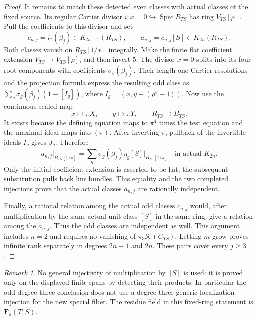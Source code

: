 \documentclass[11pt,a4paper]{article}
\theoremstyle{remark}
\newtheorem{remark}[theorem]{Remark}
\begin{document}
\begin{proof}
It remains to match these detected even classes with actual
classes of the fixed source.  Its regular Cartier divisor
$i:x=0\hookrightarrow\operatorname{Spec}R_{TS}$ has ring
$V_{TS}[\rho]$.  Pull the coefficients to this divisor and set
\[
 c_{n,j}=i_*(\beta_j)\in K_{2n-1}(R_{TS}),\qquad
 a_{n,j}=c_{n,j}[S]\in K_{2n}(R_{TS}).
\]
Both classes vanish on $R_{TS}[1/x]$ integrally.
Make the finite flat coefficient extension
$V_{TS}\to V_{TS}[\rho]$, and then invert $5$.
The divisor $x=0$ splits into its four root components with
coefficients $\sigma_g(\beta_j)$.
Their length-one Cartier resolutions and the projection
formula express the resulting odd class as
$\sum_g\sigma_g(\beta_j)(1-[I_g])$, where
$I_g=(x,y-(\rho^g-1))$.
Now use the continuous scaled map
\[
 x\longmapsto\pi X,\qquad y\longmapsto\pi Y,\qquad
 R_{TS}\longrightarrow B_{TS}.
\]
It exists because the defining equation maps to $\pi^4$ times
the test equation and the maximal ideal maps into $(\pi)$.
After inverting $\pi$, pullback of the invertible ideals $I_g$
gives $J_g$.  Therefore
\[
 a_{n,j}|_{B_{TS}[1/\pi]}
   =\sum_g\sigma_g(\beta_j)\eta_g[S]\big|_{B_{TS}[1/\pi]}
       \quad\text{in actual }K_{2n}.
\]
Only the initial coefficient extension is asserted to be flat;
the subsequent substitution pulls back line bundles.
This equality and the two completed injections prove that
the actual classes $a_{n,j}$ are rationally independent.

Finally, a rational relation among the actual odd classes
$c_{n,j}$ would, after multiplication by the same actual unit
class $[S]$ in the same ring, give a relation among the
$a_{n,j}$.  Thus the odd classes are independent as well.
This argument includes $n=2$ and requires no vanishing of
$\pi_3\mathcal K(C_{TS})$.
Letting $m$ grow proves infinite rank separately in degrees
$2n-1$ and $2n$.  These pairs cover every $j\geq3$.
\end{proof}

\begin{remark}
No general injectivity of multiplication by $[S]$ is used:
it is proved only on the displayed finite spans by detecting
their products.  In particular the odd degree-three conclusion
does not use a degree-three generic-localization injection for
the new special fiber.  The residue field in this fixed-ring
statement is $\overline{\mathbf F}_5(T,S)$.
\end{remark}

\appendix
\end{document}
